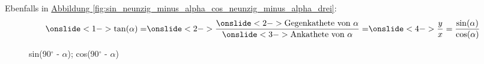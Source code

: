 \documentclass{standalone}
\begin{document}
\begin{frame}{4}
	Ebenfalls in \hyperref[fig:sin_neunzig_minus_alpha_cos_neunzig_minus_alpha_drei]{Abbildung \autoref{fig:sin_neunzig_minus_alpha_cos_neunzig_minus_alpha_drei}}: \\
	\begin{align}
    \onslide<1->{\tan(\alpha) =} \onslide<2->{\frac{\onslide<2->{\text{Gegenkathete von $\alpha$}}}{\onslide<3->{\text{Ankathete von $\alpha$}}} =} \onslide<4->{\frac{y}{x} = \frac{\sin(\alpha)}{\cos(\alpha)}}
	\end{align}
	
	\begin{figure}[hb!]
		\centering
		\def\svgwidth{150px}
		
		\caption{sin(90$^\circ$ - $\alpha$); cos(90$^\circ$ - $\alpha$)}
		\label{fig:sin_neunzig_minus_alpha_cos_neunzig_minus_alpha_drei}
	\end{figure}
\end{frame}
\end{document}
